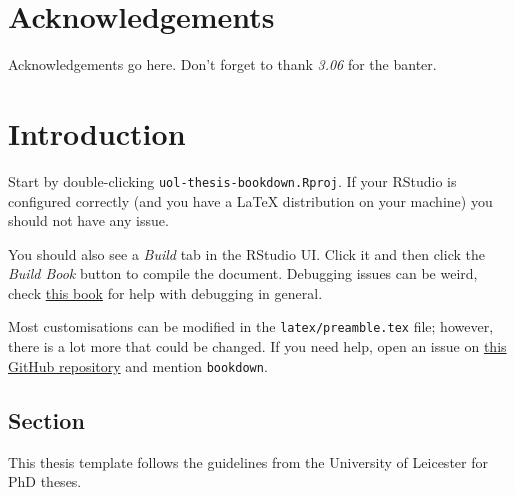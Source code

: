 \documentclass[
  12pt,
  oneside]{book}
\begin{document}
\cleardoublepage

\chapter*{Acknowledgements}
{}


Acknowledgements go here.
Don't forget to thank \emph{3.06} for the banter.


\cleardoublepage


\renewcommand{\contentsname}{Table of Contents}
\tableofcontents

\listoffigures

\listoftables


\cleardoublepage

\mainmatter

\hypertarget{intro}{%
\chapter{Introduction}\label{intro}}

Start by double-clicking \texttt{uol-thesis-bookdown.Rproj}.
If your RStudio is configured correctly (and you have a \LaTeX\xspace distribution on your machine) you should not have any issue.

You should also see a \emph{Build} tab in the RStudio UI.
Click it and then click the \emph{Build Book} button to compile the document.
Debugging issues can be weird, check \href{https://www.goodreads.com/en/book/show/29437996-copying-and-pasting-from-stack-overflow}{this book} for help with debugging in general.

Most customisations can be modified in the \texttt{latex/preamble.tex} file; however, there is a lot more that could be changed.
If you need help, open an issue on \href{https://github.com/ellessenne/uol-thesis}{this GitHub repository} and mention \texttt{bookdown}.

\hypertarget{intro-section}{%
\section{Section}\label{intro-section}}

This thesis template follows the guidelines from the University of Leicester for PhD theses.
\end{document}
